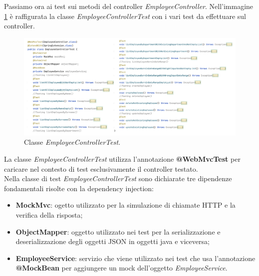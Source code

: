 Passiamo ora ai test sui metodi del controller \textit{EmployeeController}. Nell'immagine \ref{employee-controller-test} è raffigurata la classe \textit{EmployeeControllerTest} con i vari test da effettuare sul controller.
\FloatBarrier
\begin{figure}[!ht]
\begin{mdframed}
\centering
\includegraphics[width=1\linewidth]{immagini/EmployeeControllerTest.pdf}
\end{mdframed}
\caption{Classe \textit{EmployeeControllerTest}.}
\label{employee-controller-test}
\end{figure}
\FloatBarrier
La classe \textit{EmployeeControllerTest} utilizza l'annotazione \textbf{@WebMvcTest} per caricare nel contesto di test esclusivamente il controller testato.\\
Nella classe di test \textit{EmployeeControllerTest} sono dichiarate tre dipendenze fondamentali risolte con la dependency injection:
\begin{itemize}
  \item \textbf{MockMvc}: ogetto utilizzato per la simulazione di chiamate HTTP e la verifica della risposta;
  \item \textbf{ObjectMapper}: oggetto utilizzato nei test per la serializzazione e deserializzazione degli oggetti JSON in oggetti java e viceversa;
  \item \textbf{EmployeeService}: servizio che viene utilizzato nei test che usa l'annotazione \textbf{@MockBean} per aggiungere un mock dell'oggetto \textit{EmployeeService}.
\end{itemize}
